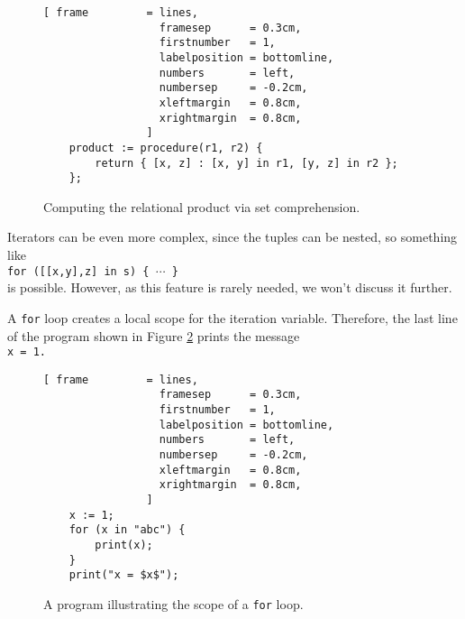 \begin{figure}[!ht]
\centering
\begin{Verbatim}[ frame         = lines, 
                  framesep      = 0.3cm, 
                  firstnumber   = 1,
                  labelposition = bottomline,
                  numbers       = left,
                  numbersep     = -0.2cm,
                  xleftmargin   = 0.8cm,
                  xrightmargin  = 0.8cm,
                ]
    product := procedure(r1, r2) {
        return { [x, z] : [x, y] in r1, [y, z] in r2 };
    };
\end{Verbatim}
\vspace*{-0.3cm}
\caption{Computing the relational product via set comprehension.}
\label{fig:relational-product.stlx}
\end{figure}

Iterators can be even more complex, since the tuples can be nested, so something like
\\[0.2cm]
\hspace*{1.3cm}
\texttt{for ([[x,y],z] in s) \{ $\cdots$ \}}
\\[0.2cm]
is possible.  However, as this feature is rarely needed, we won't discuss it further.


A \texttt{for} loop creates a local scope for the iteration variable.  Therefore, the last
line of the program shown in Figure \ref{fig:scope-for-loop.stlx} prints the message
\\[0.2cm]
\hspace*{1.3cm}
\texttt{x = 1.}

\begin{figure}[!ht]
\centering
\begin{Verbatim}[ frame         = lines, 
                  framesep      = 0.3cm, 
                  firstnumber   = 1,
                  labelposition = bottomline,
                  numbers       = left,
                  numbersep     = -0.2cm,
                  xleftmargin   = 0.8cm,
                  xrightmargin  = 0.8cm,
                ]
    x := 1;
    for (x in "abc") {
        print(x);
    }
    print("x = $x$");
\end{Verbatim}
\vspace*{-0.3cm}
\caption{A program illustrating the scope of a \texttt{for} loop.}
\label{fig:scope-for-loop.stlx}
\end{figure}




